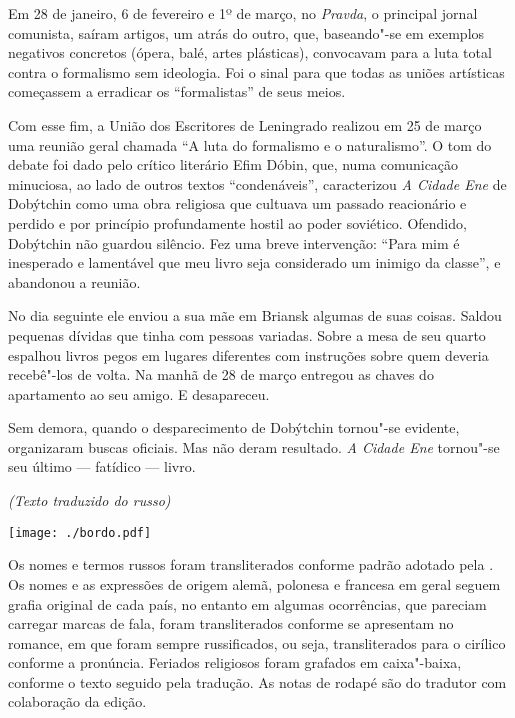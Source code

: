 Em 28 de janeiro, 6 de fevereiro e 1º de março, no \emph{Pravda}, o
principal jornal comunista, saíram artigos, um atrás do outro, que,
baseando"-se em exemplos negativos concretos (ópera, balé, artes
plásticas), convocavam para a luta total contra o formalismo sem
ideologia. Foi o sinal para que todas as uniões artísticas começassem a
erradicar os ``formalistas'' de seus meios.

Com esse fim, a União dos Escritores de Leningrado realizou em 25 de
março uma reunião geral chamada ``A luta do formalismo e o
naturalismo''. O tom do debate foi dado pelo crítico literário Efim
Dóbin, que, numa comunicação minuciosa, ao lado de outros textos
``condenáveis'', caracterizou \emph{A Cidade Ene} de Dobýtchin como uma
obra religiosa que cultuava um passado reacionário e perdido e por
princípio profundamente hostil ao poder soviético. Ofendido, Dobýtchin
não guardou silêncio. Fez uma breve intervenção: ``Para mim é inesperado
e lamentável que meu livro seja considerado um inimigo da classe'', e
abandonou a reunião.

No dia seguinte ele enviou a sua mãe em Briansk algumas de suas coisas.
Saldou pequenas dívidas que tinha com pessoas variadas. Sobre a mesa de
seu quarto espalhou livros pegos em lugares diferentes com instruções
sobre quem deveria recebê"-los de volta. Na manhã de 28 de março entregou
as chaves do apartamento ao seu amigo. E desapareceu.

Sem demora, quando o desparecimento de Dobýtchin tornou"-se evidente,
organizaram buscas oficiais. Mas não deram resultado. \emph{A Cidade
Ene} tornou"-se seu último --- fatídico --- livro.


\begin{flushright}
\emph{(Texto traduzido do russo)}
\end{flushright}

\pagebreak
\thispagestyle{empty}

\vspace*{7.3cm}\hspace*{-3cm}\texttt{[image: ./bordo.pdf]}


\pagebreak
\thispagestyle{empty}

\begin{vplace}[60]
\begin{centering}
{\small{
Os nomes e termos russos foram transliterados conforme padrão adotado pela \scalebox{.8}{USP}. Os nomes e as expressões de origem alemã, polonesa e francesa em geral seguem grafia original de cada país, no entanto em algumas ocorrências, que pareciam carregar marcas de fala, foram transliterados conforme se apresentam no romance, em que foram sempre russificados, ou seja, transliterados para o cirílico conforme a pronúncia. Feriados religiosos foram grafados em caixa"-baixa, conforme o texto seguido pela tradução. As notas de rodapé são do tradutor com colaboração da edição.
}}
\end{centering}
\end{vplace}
\thispagestyle{empty}